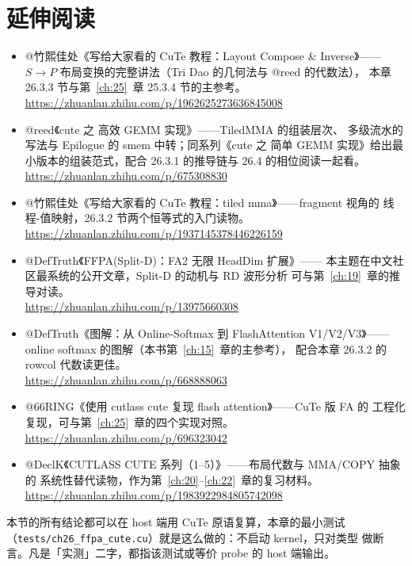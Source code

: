 \section*{延伸阅读}

\begin{itemize}[itemsep=2pt,topsep=2pt]
  \item @竹熙佳处《写给大家看的 CuTe 教程：Layout Compose \& Inverse》——
        $S\to P$ 布局变换的完整讲法（Tri Dao 的几何法与 @reed 的代数法），
        本章 26.3.3 节与第~\ref{ch:25}~章 25.3.4 节的主参考。\\
        \url{https://zhuanlan.zhihu.com/p/1962625273636845008}
  \item @reed《cute 之 高效 GEMM 实现》——TiledMMA 的组装层次、
        多级流水的写法与 Epilogue 的 smem 中转；同系列《cute 之 简单
        GEMM 实现》给出最小版本的组装范式，配合 26.3.1 的推导链与
        26.4 的相位阅读一起看。\\
        \url{https://zhuanlan.zhihu.com/p/675308830}
  \item @竹熙佳处《写给大家看的 CuTe 教程：tiled mma》——fragment 视角的
        线程-值映射，26.3.2 节两个恒等式的入门读物。\\
        \url{https://zhuanlan.zhihu.com/p/1937145378446226159}
  \item @DefTruth《FFPA(Split-D)：FA2 无限 HeadDim 扩展》——
        本主题在中文社区最系统的公开文章，Split-D 的动机与 RD 波形分析
        可与第~\ref{ch:19}~章的推导对读。\\
        \url{https://zhuanlan.zhihu.com/p/13975660308}
  \item @DefTruth《图解：从 Online-Softmax 到 FlashAttention V1/V2/V3》——
        online softmax 的图解（本书第~\ref{ch:15}~章的主参考），
        配合本章 26.3.2 的 rowcol 代数读更佳。\\
        \url{https://zhuanlan.zhihu.com/p/668888063}
  \item @66RING《使用 cutlass cute 复现 flash attention》——CuTe 版 FA 的
        工程化复现，可与第~\ref{ch:25}~章的四个实现对照。\\
        \url{https://zhuanlan.zhihu.com/p/696323042}
  \item @DeclK《CUTLASS CUTE 系列（1--5）》——布局代数与 MMA/COPY 抽象的
        系统性替代读物，作为第~\ref{ch:20}--\ref{ch:22}~章的复习材料。\\
        \url{https://zhuanlan.zhihu.com/p/1983922984805742098}
\end{itemize}



本节的所有结论都可以在 host 端用 CuTe 原语复算，本章的最小测试
（\texttt{tests/\allowbreak{}ch26\_\allowbreak{}ffpa\_\allowbreak{}cute.\allowbreak{}cu}）就是这么做的：不启动 kernel，只对类型
做断言。凡是「实测」二字，都指该测试或等价 probe 的 host 端输出。
